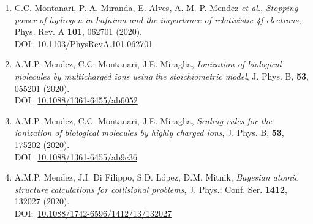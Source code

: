 \begin{enumerate}
\newpage
\item
C.C. Montanari, P. A. Miranda, E. Alves, A. M. P. Mendez \textit{et al.},
\textit{Stopping power of hydrogen in hafnium and the importance of relativistic 4f electrons},
Phys. Rev. A \textbf{101}, 062701 (2020). \\
DOI:~\href{http://www.doi.org/10.1103/PhysRevA.101.062701}{10.1103/PhysRevA.101.062701} 


\item
A.M.P. Mendez, C.C. Montanari, J.E. Miraglia,
\textit{Ionization of biological molecules by multicharged ions using the stoichiometric model},
J. Phys. B, \textbf{53}, 055201 (2020). \\
DOI:~\href{http://www.doi.org/10.1088/1361-6455/ab6052}{10.1088/1361-6455/ab6052}

\item
A.M.P. Mendez, C.C. Montanari, J.E. Miraglia,
\textit{Scaling rules for the ionization of biological molecules by highly charged ions},
J. Phys. B, \textbf{53}, 175202 (2020). \\
DOI:~\href{http://www.doi.org/10.1088/1361-6455/ab9c36}{10.1088/1361-6455/ab9c36}

\item
A.M.P. Mendez, J.I. Di Filippo, S.D. López, D.M. Mitnik,
\textit{Bayesian atomic structure calculations for collisional problems},
J. Phys.: Conf. Ser. \textbf{1412}, 132027 (2020). \\
DOI:~\href{http://www.doi.org/10.1088/1742-6596/1412/13/132027}{10.1088/1742-6596/1412/13/132027}

\end{enumerate}

